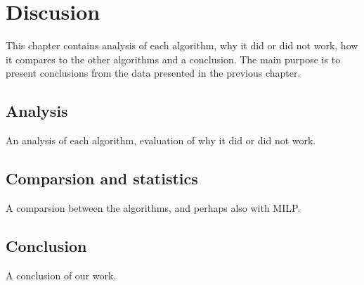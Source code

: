 \chapter{Discusion}
This chapter contains analysis of each algorithm, why it did or did
not work, how it compares to the other algorithms and a
conclusion. The main purpose is to present conclusions from the data presented
in the previous chapter. 
\section{Analysis}
An analysis of each algorithm,  evaluation of why it did or did not work. \par

\section{Comparsion and statistics}
A comparsion between the algorithms, and perhaps also with MILP. \par

\section{Conclusion}
A conclusion of our work.


